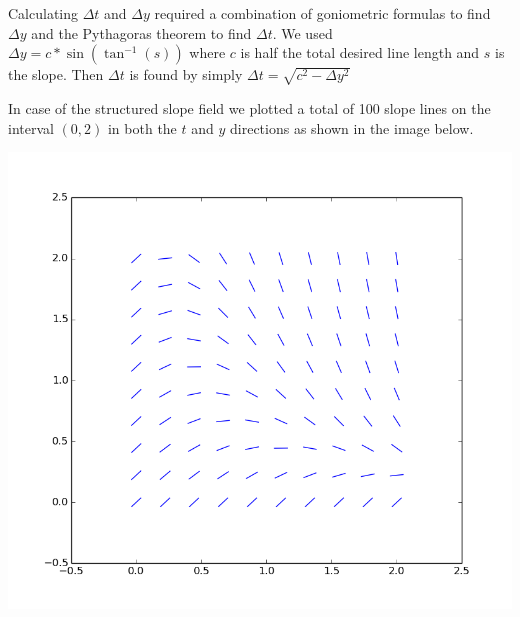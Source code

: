 \documentclass[a4paper,12px]{article}
\begin{document}
Calculating $\Delta t$ and $\Delta y$ required a combination of goniometric
formulas to find $\Delta y$ and the Pythagoras theorem to find $\Delta t$.  We
used $\Delta y = c*\sin(\tan^{-1}(s))$ where $c$ is half the total
desired line length and $s$ is the slope. Then $\Delta t$ is found by simply
$\Delta t= \sqrt{c^2-\Delta y^2}$

In case of the structured slope field we plotted a total of 100 slope lines on
the interval $(0,2)$ in both the $t$ and $y$ directions as shown in the image
below.
\begin{center}
    \includegraphics[width=\textwidth]{slopefield}
\end{center}
\end{document}
